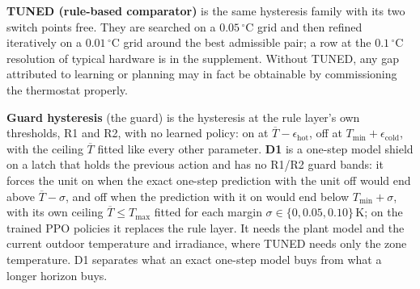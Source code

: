 \documentclass[3p,twocolumn,number]{elsarticle}
\newcommand{\Tmin}{T_{\min}}
\newcommand{\Tmax}{T_{\max}}
\begin{document}
\textbf{TUNED (rule-based comparator)} is the same hysteresis family with its two switch points free. They are searched on a $0.05\,^\circ$C grid and then refined iteratively on a $0.01\,^\circ$C grid around the best admissible pair; a row at the $0.1\,^\circ$C resolution of typical hardware is in the supplement. Without TUNED, any gap attributed to learning or planning may in fact be obtainable by commissioning the thermostat properly.

\textbf{Guard hysteresis} (the guard) is the hysteresis at the rule layer's own thresholds, R1 and R2, with no learned policy: on at $\overline{T}-\epsilon_{\mathrm{hot}}$, off at $\Tmin+\epsilon_{\mathrm{cold}}$, with the ceiling $\overline{T}$ fitted like every other parameter. \textbf{D1} is a one-step model shield on a latch that holds the previous action and has no R1/R2 guard bands: it forces the unit on when the exact one-step prediction with the unit off would end above $\overline{T}-\sigma$, and off when the prediction with it on would end below $\Tmin+\sigma$, with its own ceiling $\overline{T}\le\Tmax$ fitted for each margin $\sigma\in\{0,0.05,0.10\}\,$K; on the trained PPO policies it replaces the rule layer. It needs the plant model and the current outdoor temperature and irradiance, where TUNED needs only the zone temperature. D1 separates what an exact one-step model buys from what a longer horizon buys.
\end{document}
